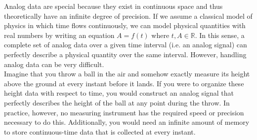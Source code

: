Analog data are special because they exist in continuous space and thus theoretically have an infinite degree of precision. If we assume a classical model of physics in which time flows continuously, we can model physical quantities with real numbers by writing an equation $A=f(t)$ where $t,A\in\mathbb{R}$. In this sense, a complete set of analog data over a given time interval (i.e. an analog signal) can perfectly describe a physical quantity over the same interval. However, handling analog data can be very difficult. \\

Imagine that you throw a ball in the air and somehow exactly measure its height above the ground at every instant before it lands. If you were to organize these height data with respect to time, you would construct an analog signal that perfectly describes the height of the ball at any point during the throw. In practice, however, no measuring instrument has the required speed or precision necessary to do this. Additionally, you would need an infinite amount of memory to store continuous-time data that is collected at every instant. \\\\


